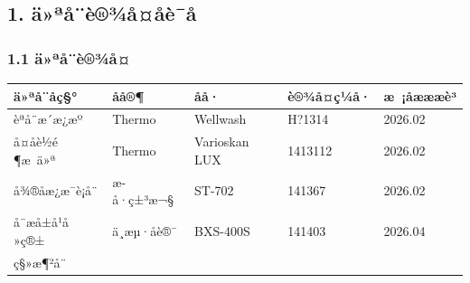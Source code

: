 \documentclass[UTF8,10pt,a4paper,fontset=fandol]{ctexart}
\newcommand{\fieldvalue}[1]{#1}
\newcommand{\handwritten}[1]{#1}
\begin{document}
\begin{center}
\subsection*{1. ä»ªå¨è®¾å¤åè¯å}

\subsubsection*{1.1 ä»ªå¨è®¾å¤}

\small
\begin{tabularx}{\textwidth}{|X|X|X|X|X|}
\hline
ä»ªå¨åç§° & åå®¶ & åå· & è®¾å¤ç¼å· & æ ¡åæææè³ \\ \hline
èªå¨æ´æ¿æº &
\fieldvalue{Thermo} &
\fieldvalue{Wellwash} &
\fieldvalue{\handwritten{H?1314}} &
\fieldvalue{\handwritten{2026.02}}
\\ \hline
å¤åè½é¶æ ä»ª &
\fieldvalue{Thermo} &
\fieldvalue{Varioskan LUX} &
\fieldvalue{\handwritten{1413112}} &
\fieldvalue{\handwritten{2026.02}}
\\ \hline
å¾®å­æ¿æ¯è¡å¨ &
\fieldvalue{æ­å·ç±³æ¬§} &
\fieldvalue{ST-702} &
\fieldvalue{\handwritten{141367}} &
\fieldvalue{\handwritten{2026.02}}
\\ \hline
å¯æå±å¹å»ç®± &
\fieldvalue{ä¸æµ·åè®¯} &
\fieldvalue{BXS-400S} &
\fieldvalue{\handwritten{141403}} &
\fieldvalue{\handwritten{2026.04}}
\\ \hline
ç§»æ¶²å¨ &

\end{tabularx}
\end{center}
\end{document}
